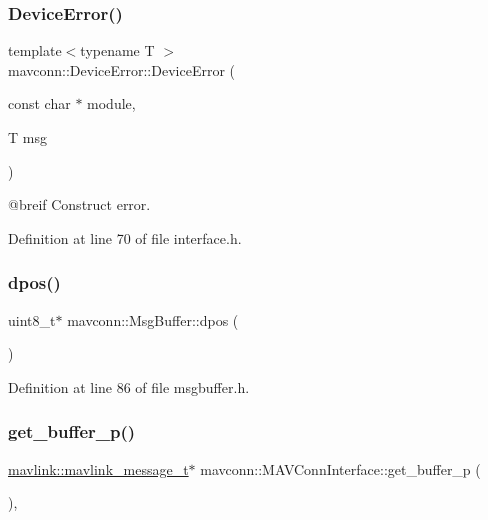 \mbox{\label{group__mavconn_ga686d0d40b10a4d013dc09de32a43efaa}} 
\subsubsection{\texorpdfstring{DeviceError()}{DeviceError()}}
{\footnotesize\ttfamily template$<$typename T $>$ \\
mavconn\+::\+Device\+Error\+::\+Device\+Error (\begin{DoxyParamCaption}\item[{const char $\ast$}]{module,  }\item[{T}]{msg }\end{DoxyParamCaption})\hspace{0.3cm}{\ttfamily [inline]}}

@breif Construct error. 

Definition at line 70 of file interface.\+h.

\mbox{\label{group__mavconn_ga0c971b3c0d8d540ccaf7e1929a5ecf07}} 
\subsubsection{\texorpdfstring{dpos()}{dpos()}}
{\footnotesize\ttfamily uint8\+\_\+t$\ast$ mavconn\+::\+Msg\+Buffer\+::dpos (\begin{DoxyParamCaption}{ }\end{DoxyParamCaption})\hspace{0.3cm}{\ttfamily [inline]}}



Definition at line 86 of file msgbuffer.\+h.

\mbox{\label{group__mavconn_gae9521a7ebe812821fcd15a63f1c12b10}} 
\subsubsection{\texorpdfstring{get\_buffer\_p()}{get\_buffer\_p()}}
{\footnotesize\ttfamily \mbox{\hyperlink{include__v0_89_2mavlink__types_8h_a63b963764c09dc72f4910c1521e325b9}{mavlink\+::mavlink\+\_\+message\+\_\+t}}$\ast$ mavconn\+::\+M\+A\+V\+Conn\+Interface\+::get\+\_\+buffer\+\_\+p (\begin{DoxyParamCaption}{ }\end{DoxyParamCaption})\hspace{0.3cm}{\ttfamily [inline]}, {\ttfamily [protected]}}



